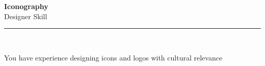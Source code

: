 \documentclass[11pt,a4paper]{memoir}
\begin{document}
    \begin{Spacing}{0.75}%
        \noindent
        \Large
        \textbf{Iconography}\\[3pt]
        \scriptsize\color{gray}Designer Skill\\ 
        \rule{\textwidth}{.3mm}\\
        
        \vspace{3mm}
        \noindent
        \begin{minipage}[t]{53mm}
            \begin{flushleft}
            {
                \normalsize
                \begin{Spacing}{1}%
                \color{black}\textrm{You have experience designing icons and logos with cultural relevance}\\
                \end{Spacing}
            }
            \end{flushleft}
        \end{minipage}

        \vspace{5mm}
        \noindent
        \begin{minipage}[t]{53mm}
            \begin{flushleft}
            {
                \normalsize
                \begin{Spacing}{1}%
                \color{gray}\textit{}\\
                \end{Spacing}
            }
            \end{flushleft}
        \end{minipage}
    \end{Spacing}
    \clearpage
\end{document}
